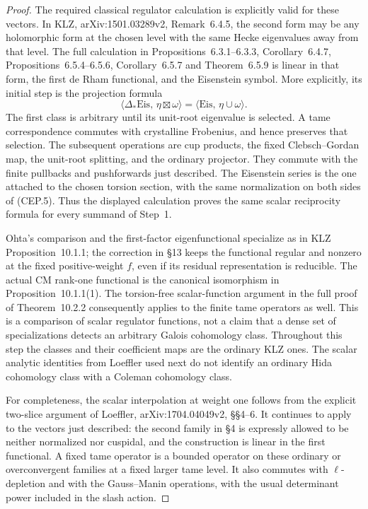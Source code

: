 \begin{proof}
The required classical regulator calculation is explicitly
valid for these vectors.  In KLZ,
arXiv:1501.03289v2, Remark~6.4.5, the second form may
be any holomorphic form at the chosen level with the
same Hecke eigenvalues away from that level.
The full calculation in Propositions~6.3.1--6.3.3,
Corollary~6.4.7, Propositions~6.5.4--6.5.6,
Corollary~6.5.7 and Theorem~6.5.9 is linear in that
form, the first de Rham functional, and the Eisenstein
symbol.  More explicitly, its initial step is the
projection formula
\[
 \langle\Delta_*\mathrm{Eis},\,\eta\boxtimes\omega\rangle
       =\langle\mathrm{Eis},\,\eta\cup\omega\rangle.
                                                        \tag{CEP.5}
\]
The first class is arbitrary until its unit-root
eigenvalue is selected.  A tame correspondence commutes
with crystalline Frobenius, and hence preserves that
selection.  The subsequent operations are cup products,
the fixed Clebsch--Gordan map, the unit-root splitting,
and the ordinary projector.  They commute with the
finite pullbacks and pushforwards just described.
The Eisenstein series is the one attached to the
chosen torsion section, with the same normalization
on both sides of (CEP.5).
Thus the displayed calculation proves the same scalar
reciprocity formula for every summand of Step~1.

Ohta's comparison and the first-factor eigenfunctional
specialize as in KLZ Proposition~10.1.1; the correction
in \S13 keeps the functional regular and nonzero at
the fixed positive-weight $f$, even if its residual
representation is reducible.  The actual CM rank-one
functional is the canonical isomorphism in
Proposition~10.1.1(1).
The torsion-free scalar-function argument in the full
proof of Theorem~10.2.2 consequently applies to the
finite tame operators as well.
This is a comparison of scalar regulator functions,
not a claim that a dense set of specializations detects
an arbitrary Galois cohomology class.
Throughout this step the classes and their coefficient
maps are the ordinary KLZ ones.
The scalar analytic identities from Loeffler used
next do not identify an ordinary Hida cohomology
class with a Coleman cohomology class.

For completeness, the scalar interpolation at weight
one follows from the explicit two-slice argument of
Loeffler, arXiv:1704.04049v2, \S\S4--6.
It continues to apply to the vectors just described:
the second family in \S4 is expressly allowed to be
neither normalized nor cuspidal, and the construction
is linear in the first functional.  A fixed tame
operator is a bounded operator on these ordinary or
overconvergent families at a fixed larger tame level.
It also commutes with $\ell$-depletion and with the
Gauss--Manin operations, with the usual determinant
power included in the slash action.


\end{proof}
